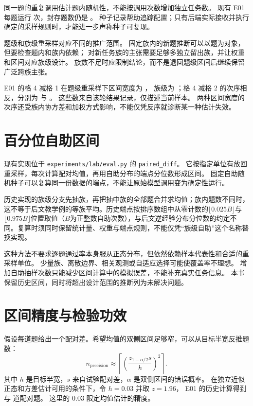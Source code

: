 同一题的重复调用估计题内随机性，不能按调用次数增加独立任务数。
现有 E01 每题运行  次，封存题数仍是 。
种子记录帮助追踪配置；只有后端实际接收并执行确定的采样规则时，才能进一步声称种子可复现。

题级和族级重采样对应不同的推广范围。
固定族内的新题推断可以以题为对象，但要检查题内和族内依赖；
对新任务族的主张需要足够多独立留出族，并让权重和区间对应族级设计。
族数不足时应限制结论，而不是退回题级区间后继续保留广泛跨族主张。

E01 的格 4 减格 1 在题级重采样下区间宽度为 ，
族级为 ；格 4 减格 2 的次序相反，分别为  与 。
这些数来自该轮结果记录，仅描述当前样本。
两种区间宽度的次序还受族内协方差和加权方式影响，不能仅凭反序就诊断某一种估计失效。

\section{百分位自助区间}

现有实现位于 \texttt{experiments/lab/eval.py} 的 \texttt{paired\_diff}。
它按指定单位有放回重采样，每次计算配对均值，再用自助分布的端点分位数形成区间。
固定自助随机种子可以复算同一份数据的端点，不能让原始模型调用变为确定性运行。

历史实现的族级分支先抽族，再把抽中族的全部题合并求均值；族内题数不同时，这不等于后文教学例的等族平均。历史端点按排序数组中从零计数的$\lfloor0.025B\rfloor$与$\lfloor0.975B\rfloor$位置取值（$B$为正整数自助次数），与后文逆经验分布分位数的约定不同。复算时须同时保留统计量、权重与端点规则，不能仅凭“族级自助”这个名称替换实现。

这种方法不要求逐题通过率本身服从正态分布，但依然依赖样本代表性和合适的重采样单位。
少量族、离散边界、相关观测或自适应选择可能使覆盖率不理想。
增加自助抽样次数只能减少区间计算中的模拟误差，不能补充真实任务信息。
本书保留历史区间，同时将超出设计范围的推断列为未解决问题。

\section{区间精度与检验功效}

假设每道题给出一个配对差。希望均值的双侧区间足够窄，可以从目标半宽反推题数：
\begin{equation}
 n_{\mathrm{precision}}\approx
 \left\lceil\left(\frac{z_{1-\alpha/2}s}{h}\right)^2\right\rceil.
 \label{eq:samplesize}
\end{equation}
其中 $h$ 是目标半宽，$s$ 来自试验配对差，$\alpha$ 是双侧区间的错误概率。
在独立近似正态和方差估计可用的条件下，令 $h=0.03$ 并取 $z=1.96$，
E01 的历史计算得到  与  道配对题。
这里的 $0.03$ 限定均值估计的精度。


